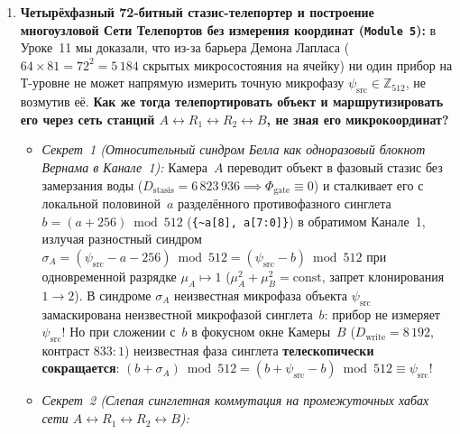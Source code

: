 \begin{enumerate}[label=\textbf{\arabic*.},leftmargin=*]
\begin{itemize}[noitemsep]
    железо для гема $2\mathrm{C}_6 + \mathrm{N}_{2,14} \to \mathrm{Fe}_{26}$ ($Z = 12 + 14 = \mathbf{26 = 2N_\varphi}$),
    фосфор для АТФ $\mathrm{N}_7 + \mathrm{O}_8 \to \mathrm{P}_{15}$ ($Z = \mathbf{15}$),
    сера для аминокислот $\mathrm{O}_{2,16} \to \mathrm{S}_{16}$ ($Z = \mathbf{16}$),
    магний $2\mathrm{C}_6 \to \mathrm{Mg}_{12}$ ($Z = \mathbf{12}$),
    кальций ${}^{12}_6\mathrm{C} + {}^{14}_7\mathrm{N_2} \to {}^{40}_{20}\mathrm{Ca}$ ($Z = \mathbf{20}, A = \mathbf{40}$ с нулевым остатком нейтронов!),
    калий $\mathrm{Ar}_{18} + \mathrm{H}_1 \to \mathrm{K}_{19}$ ($Z = \mathbf{19}$) и
    пищевая соль $2\mathrm{N}_{2,14} \leftrightarrow \mathrm{NaCl}_{28}$ ($Z = 11 + 17 = \mathbf{28}$)!
  \end{itemize}
\item \textbf{Четырёхфазный 72-битный стазис-телепортер и построение многоузловой Сети Телепортов без измерения координат (\texttt{Module~5}):}
  в Уроке~11 мы доказали, что из-за барьера Демона Лапласа ($64\times 81 = 72^2 = 5\,184$ скрытых микросостояния на ячейку) ни один прибор на Т-уровне не может напрямую измерить точную микрофазу $\psi_{\mathrm{src}}\in\mathbb{Z}_{512}$, не возмутив её. \textbf{Как же тогда телепортировать объект и маршрутизировать его через сеть станций $A \leftrightarrow R_1 \leftrightarrow R_2 \leftrightarrow B$, не зная его микрокоординат?}
  \begin{itemize}[noitemsep]
  \item \emph{Секрет~1 (Относительный синдром Белла как одноразовый блокнот Вернама в Канале~1):}
    Камера~$A$ переводит объект в фазовый стазис без замерзания воды ($D_{\mathrm{stasis}} = 6\,823\,936 \implies \Phi_{\mathrm{gate}}\equiv 0$) и сталкивает его с локальной половиной~$a$ разделённого противофазного синглета $b = (a+256)\bmod 512$ (\texttt{\{\~{}a[8], a[7:0]\}}) в обратимом Канале~1, излучая разностный синдром $\sigma_A = (\psi_{\mathrm{src}} - a - 256)\bmod 512 = (\psi_{\mathrm{src}} - b)\bmod 512$ при одновременной разрядке $\mu_A\mapsto 1$ ($\mu_A^2+\mu_B^2=\mathrm{const}$, запрет клонирования $1\to 2$). В синдроме $\sigma_A$ неизвестная микрофаза объекта $\psi_{\mathrm{src}}$ замаскирована неизвестной микрофазой синглета~$b$: прибор не измеряет $\psi_{\mathrm{src}}$! Но при сложении с~$b$ в фокусном окне Камеры~$B$ ($D_{\mathrm{write}} = 8\,192$, контраст $833:1$) неизвестная фаза синглета \textbf{телескопически сокращается}: $(b + \sigma_A)\bmod 512 = (b + \psi_{\mathrm{src}} - b)\bmod 512 \equiv \psi_{\mathrm{src}}$!
  \item \emph{Секрет~2 (Слепая синглетная коммутация на промежуточных хабах сети $A \leftrightarrow R_1 \leftrightarrow R_2 \leftrightarrow B$):}

\end{itemize}
\end{enumerate}
